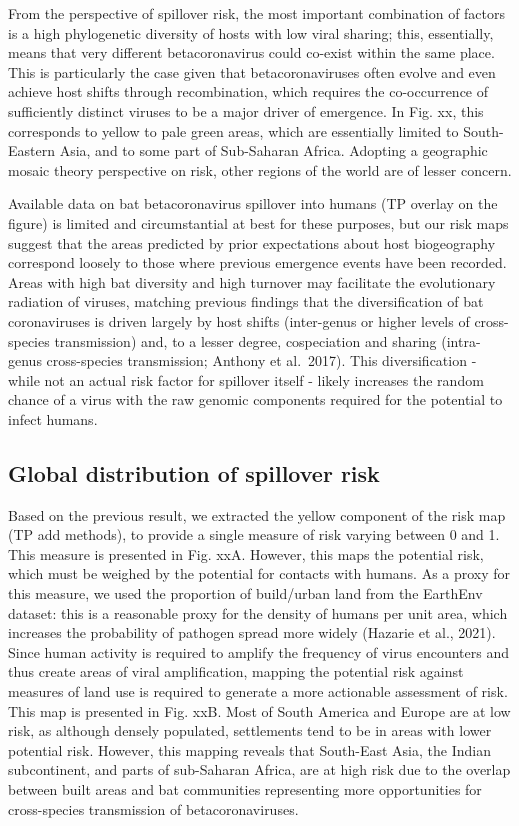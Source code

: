 \documentclass[11pt]{article}
\begin{document}
From the perspective of spillover risk, the most important combination
of factors is a high phylogenetic diversity of hosts with low viral
sharing; this, essentially, means that very different betacoronavirus
could co-exist within the same place. This is particularly the case
given that betacoronaviruses often evolve and even achieve host shifts
through recombination, which requires the co-occurrence of sufficiently
distinct viruses to be a major driver of emergence. In Fig. xx, this
corresponds to yellow to pale green areas, which are essentially limited
to South-Eastern Asia, and to some part of Sub-Saharan Africa. Adopting
a geographic mosaic theory perspective on risk, other regions of the
world are of lesser concern.

Available data on bat betacoronavirus spillover into humans (TP overlay
on the figure) is limited and circumstantial at best for these purposes,
but our risk maps suggest that the areas predicted by prior expectations
about host biogeography correspond loosely to those where previous
emergence events have been recorded. Areas with high bat diversity and
high turnover may facilitate the evolutionary radiation of viruses,
matching previous findings that the diversification of bat coronaviruses
is driven largely by host shifts (inter-genus or higher levels of
cross-species transmission) and, to a lesser degree, cospeciation and
sharing (intra-genus cross-species transmission; Anthony et al.~2017).
This diversification - while not an actual risk factor for spillover
itself - likely increases the random chance of a virus with the raw
genomic components required for the potential to infect humans.

\hypertarget{global-distribution-of-spillover-risk}{%
\subsection{Global distribution of spillover
risk}\label{global-distribution-of-spillover-risk}}

Based on the previous result, we extracted the yellow component of the
risk map (TP add methods), to provide a single measure of risk varying
between 0 and 1. This measure is presented in Fig. xxA. However, this
maps the potential risk, which must be weighed by the potential for
contacts with humans. As a proxy for this measure, we used the
proportion of build/urban land from the EarthEnv dataset: this is a
reasonable proxy for the density of humans per unit area, which
increases the probability of pathogen spread more widely (Hazarie et
al., 2021). Since human activity is required to amplify the frequency of
virus encounters and thus create areas of viral amplification, mapping
the potential risk against measures of land use is required to generate
a more actionable assessment of risk. This map is presented in Fig. xxB.
Most of South America and Europe are at low risk, as although densely
populated, settlements tend to be in areas with lower potential risk.
However, this mapping reveals that South-East Asia, the Indian
subcontinent, and parts of sub-Saharan Africa, are at high risk due to
the overlap between built areas and bat communities representing more
opportunities for cross-species transmission of betacoronaviruses.
\end{document}
